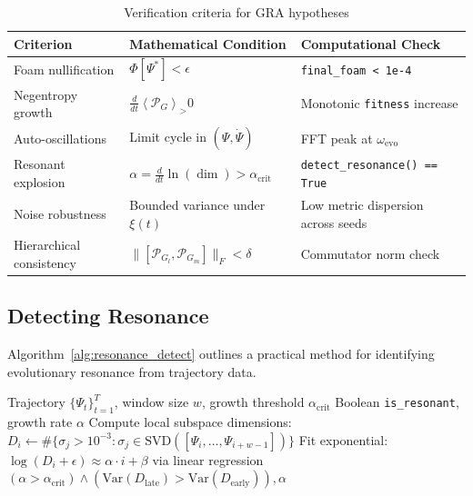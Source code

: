 \documentclass[11pt,a4paper]{article}
\theoremstyle{plain}
\theoremstyle{definition}
\theoremstyle{remark}
\newcommand{\Foam}{\Phi}
\newcommand{\Projector}{\mathcal{P}}
\newcommand{\expect}[2]{\left\langle#1\right\rangle_{#2}}
\begin{document}
\begin{table}[H]
\centering
\caption{Verification criteria for GRA hypotheses}
\label{tab:criteria}
\renewcommand{\arraystretch}{1.3}
\begin{tabular}{p{3.5cm}p{5cm}p{4cm}}
\toprule
\textbf{Criterion} & \textbf{Mathematical Condition} & \textbf{Computational Check} \\
\midrule
Foam nullification & $\Foam[\Psi^*] < \epsilon$ & \texttt{final\_foam < 1e-4} \\
Negentropy growth & $\frac{d}{dt}\expect{\Projector_G} > 0$ & Monotonic \texttt{fitness} increase \\
Auto-oscillations & Limit cycle in $(\Psi,\dot{\Psi})$ & FFT peak at $\omega_{\text{evo}}$ \\
Resonant explosion & $\alpha = \frac{d}{dt}\ln(\dim) > \alpha_{\text{crit}}$ & \texttt{detect\_resonance() == True} \\
Noise robustness & Bounded variance under $\xi(t)$ & Low metric dispersion across seeds \\
Hierarchical consistency & $\|[\Projector_{G_l}, \Projector_{G_m}]\|_F < \delta$ & Commutator norm check \\
\bottomrule
\end{tabular}
\end{table}

\subsection{Detecting Resonance}

Algorithm~\ref{alg:resonance_detect} outlines a practical method for identifying evolutionary resonance from trajectory data.

\begin{algorithm}[H]
\caption{Resonance detection via subspace dimension growth}
\label{alg:resonance_detect}
\begin{algorithmic}[1]
\Require Trajectory $\{\Psi_t\}_{t=1}^T$, window size $w$, growth threshold $\alpha_{\text{crit}}$
\Ensure Boolean \texttt{is\_resonant}, growth rate $\alpha$
\State Compute local subspace dimensions:
    \State $D_i \gets \#\{\sigma_j > 10^{-3} : \sigma_j \in \text{SVD}([\Psi_i, \dots, \Psi_{i+w-1}])\}$
\EndFor
\State Fit exponential: $\log(D_i + \epsilon) \approx \alpha \cdot i + \beta$ via linear regression
\State \Return $(\alpha > \alpha_{\text{crit}}) \land (\text{Var}(D_{\text{late}}) > \text{Var}(D_{\text{early}})), \alpha$
\end{algorithmic}
\end{algorithm}
\end{document}
